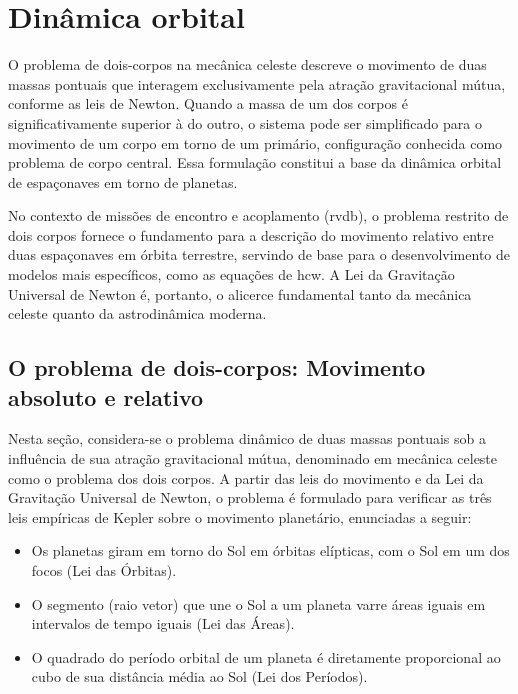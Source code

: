 \section{Dinâmica orbital}
\label{sec_dinamica_orbital}

O problema de dois-corpos na mecânica celeste descreve o movimento de duas massas pontuais que interagem exclusivamente pela atração gravitacional mútua, conforme as leis de Newton.
Quando a massa de um dos corpos é significativamente superior à do outro, o sistema pode ser simplificado para o movimento de um corpo em torno de um primário, configuração conhecida como problema de corpo central.
Essa formulação constitui a base da dinâmica orbital de espaçonaves em torno de planetas.

No contexto de missões de encontro e acoplamento (\gls{rvdb}), o problema restrito de dois corpos fornece o fundamento para a descrição do movimento relativo entre duas espaçonaves em órbita terrestre, servindo de base para o desenvolvimento de modelos mais específicos, como as equações de \gls{hcw}.
A Lei da Gravitação Universal de Newton é, portanto, o alicerce fundamental tanto da mecânica celeste quanto da astrodinâmica moderna.


\subsection{O problema de dois-corpos: Movimento absoluto e relativo}
\label{sec_doiscorpos}

Nesta seção, considera-se o problema dinâmico de duas massas pontuais sob a influência de sua atração gravitacional mútua, denominado em mecânica celeste como o problema dos dois corpos. A partir das leis do movimento e da Lei da Gravitação Universal de Newton, o problema é formulado para verificar as três leis empíricas de Kepler \cite{vallado2007fundamentals} sobre o movimento planetário, enunciadas a seguir:

\begin{itemize}
    \item Os planetas giram em torno do Sol em órbitas elípticas, com o Sol em um dos focos (Lei das Órbitas).
    \item O segmento (raio vetor) que une o Sol a um planeta varre áreas iguais em intervalos de tempo iguais (Lei das Áreas).
    \item O quadrado do período orbital de um planeta é diretamente proporcional ao cubo
de sua distância média ao Sol (Lei dos Períodos)\cite{SaraivaKeplerAula}.
\end{itemize}

